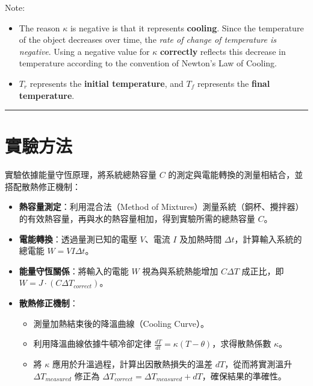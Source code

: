 \documentclass[12pt]{article}
\begin{document}
{\small
Note:
\begin{itemize}
    \item The reason $ \kappa$ is negative is that it represents \textbf{cooling}. Since the temperature of the object decreases over time, the \textit{rate of change of temperature is negative}. Using a negative value for $\kappa$ \textbf{correctly }reflects this decrease in temperature according to the convention of Newton’s Law of Cooling. 
    \item $T_r$ represents the \textbf{initial temperature}, and $T_f$ represents the \textbf{final temperature}.

\end{itemize}
}
\vspace*{0.3cm}
\hrule
\vspace*{0.3cm}


\newpage
\section{\textbf{實驗方法}}
實驗依據能量守恆原理，將系統總熱容量 $C$ 的測定與電能轉換的測量相結合，並搭配散熱修正機制：
\begin{itemize}
    \item \textbf{熱容量測定}：利用混合法（Method of Mixtures）測量系統（銅杯、攪拌器）的有效熱容量，再與水的熱容量相加，得到實驗所需的總熱容量 $C$。
    \item \textbf{電能轉換}：透過量測已知的電壓 $V$、電流 $I$ 及加熱時間 $\Delta t$，計算輸入系統的總電能 $W = V I \Delta t$。
    \item \textbf{能量守恆關係}：將輸入的電能 $W$ 視為與系統熱能增加 $C \Delta T$ 成正比，即 $W = J \cdot (C \Delta T_{correct})$。
    \item \textbf{散熱修正機制}：
        \begin{itemize}
            \item 測量加熱結束後的降溫曲線（Cooling Curve）。
            \item 利用降溫曲線依據牛頓冷卻定律 $\frac{dT}{dt} = \kappa (T-\theta)$，求得散熱係數 $\kappa$。
            \item 將 $\kappa$ 應用於升溫過程，計算出因散熱損失的溫差 $dT$，從而將實測溫升 $\Delta T_{measured}$ 修正為 $\Delta T_{correct} = \Delta T_{measured} + dT$，確保結果的準確性。
        \end{itemize}
\end{itemize}
\end{document}
